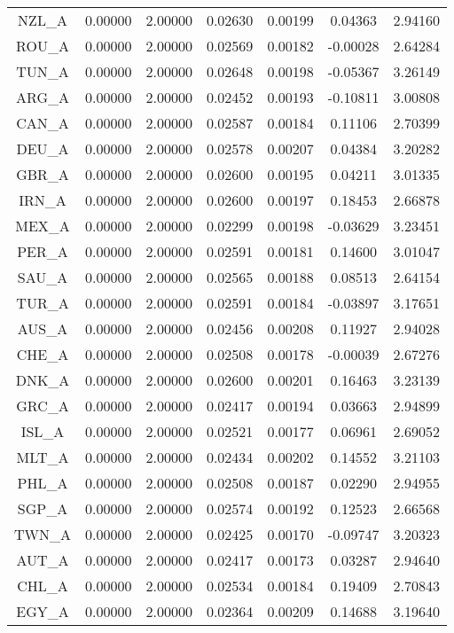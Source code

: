 \begin{longtable}{c c c c c c c}
NZL_A & 0.00000 & 2.00000 & 0.02630 & 0.00199 & 0.04363 & 2.94160 \\
ROU_A & 0.00000 & 2.00000 & 0.02569 & 0.00182 & -0.00028 & 2.64284 \\
TUN_A & 0.00000 & 2.00000 & 0.02648 & 0.00198 & -0.05367 & 3.26149 \\
ARG_A & 0.00000 & 2.00000 & 0.02452 & 0.00193 & -0.10811 & 3.00808 \\
CAN_A & 0.00000 & 2.00000 & 0.02587 & 0.00184 & 0.11106 & 2.70399 \\
DEU_A & 0.00000 & 2.00000 & 0.02578 & 0.00207 & 0.04384 & 3.20282 \\
GBR_A & 0.00000 & 2.00000 & 0.02600 & 0.00195 & 0.04211 & 3.01335 \\
IRN_A & 0.00000 & 2.00000 & 0.02600 & 0.00197 & 0.18453 & 2.66878 \\
MEX_A & 0.00000 & 2.00000 & 0.02299 & 0.00198 & -0.03629 & 3.23451 \\
PER_A & 0.00000 & 2.00000 & 0.02591 & 0.00181 & 0.14600 & 3.01047 \\
SAU_A & 0.00000 & 2.00000 & 0.02565 & 0.00188 & 0.08513 & 2.64154 \\
TUR_A & 0.00000 & 2.00000 & 0.02591 & 0.00184 & -0.03897 & 3.17651 \\
AUS_A & 0.00000 & 2.00000 & 0.02456 & 0.00208 & 0.11927 & 2.94028 \\
CHE_A & 0.00000 & 2.00000 & 0.02508 & 0.00178 & -0.00039 & 2.67276 \\
DNK_A & 0.00000 & 2.00000 & 0.02600 & 0.00201 & 0.16463 & 3.23139 \\
GRC_A & 0.00000 & 2.00000 & 0.02417 & 0.00194 & 0.03663 & 2.94899 \\
ISL_A & 0.00000 & 2.00000 & 0.02521 & 0.00177 & 0.06961 & 2.69052 \\
MLT_A & 0.00000 & 2.00000 & 0.02434 & 0.00202 & 0.14552 & 3.21103 \\
PHL_A & 0.00000 & 2.00000 & 0.02508 & 0.00187 & 0.02290 & 2.94955 \\
SGP_A & 0.00000 & 2.00000 & 0.02574 & 0.00192 & 0.12523 & 2.66568 \\
TWN_A & 0.00000 & 2.00000 & 0.02425 & 0.00170 & -0.09747 & 3.20323 \\
AUT_A & 0.00000 & 2.00000 & 0.02417 & 0.00173 & 0.03287 & 2.94640 \\
CHL_A & 0.00000 & 2.00000 & 0.02534 & 0.00184 & 0.19409 & 2.70843 \\
EGY_A & 0.00000 & 2.00000 & 0.02364 & 0.00209 & 0.14688 & 3.19640 \\

\end{longtable}
